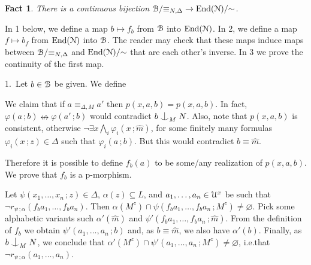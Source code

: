 \documentclass{amsproc}
\makeatletter
\def\nonfork{\mathrel{\raise0.2ex\hbox{\ooalign{\hidewidth$\vert$\hidewidth\cr\raise-0.8ex\hbox{$\smile$}}}}}
\def\U{\EuScript U}
\def\B{\EuScript B}
\def\N{\EuScript N}
\def\phi{\varphi}
\newcounter{thm}
\theoremstyle{mio}
\newtheorem{fact}[thm]{Fact}\tcolorboxenvironment{fact}{mythm}
\providecommand{\proofNameStyle}{\bfseries}
\renewenvironment{proof}[1][\proofname]{\par
  \pushQED{\qed}%
  \normalfont%
  \trivlist
  \item[\hskip\labelsep
        \proofNameStyle
    #1\@addpunct{.}]\ignorespaces
}{%
  \popQED\endtrivlist\@endpefalse
}
\makeatother
\begin{document}
\begin{fact}
  There is a continuous bijection $\B/{\equiv_{N,\Delta}}\to{\rm End}(\N)/{\sim}$.
\end{fact}

\begin{proof}
  In 1 below, we define a map $b\mapsto f_b$ from $\B$ into ${\rm End}(\N)$. In 2, we define a map $f\mapsto b_f$ from ${\rm End}(\N)$ into $\B$.
  The reader may check that these maps induce maps between $\B/{\equiv_{N,\Delta}}$ and ${\rm End}(\N)/{\sim}$ that are each other's inverse.
  In 3 we prove the continuity of the first map.

  1.\ 
  Let $b\in\B$ be given.
  We define
  
  \ceq{\hfill p(x,y,z)}{=}{\big\{\phi(y\,;z)\rightarrow\phi(x\,;\hat m)\ :\ \phi(x\,;z)\in\Delta\big\}.}

  We claim that if $a\equiv_{\Delta,M}a'$ then $p(x,a,b)=p(x,a,b)$.
  In fact, $\phi(a\,;b)\nleftrightarrow\phi(a'\,;b)$ would contradict $b\nonfork_MN$.
  Also, note that $p(x,a,b)$ is consistent, otherwise $\neg\exists x\bigwedge_i\phi_i(x\,;\hat m)$, for some finitely many formulas $\phi_i(x\,;z)\in\Delta$ such that $\phi_i(a\,;b)$.
  But this would contradict $b\equiv\hat m$.

  Therefore it is possible to define $f_b(a)$ to be some/any realization of $p(x,a,b)$.
  We prove that $f_b$ is a p-morphism.

  Let $\psi(x_1,\dots,x_n\,;z)\in\Delta$, $\alpha(z)\subseteq L$, and $a_1,\dots,a_n\in\U^x$ be such that $\neg r_{\psi\,;\alpha}(f_ba_1,\dots,f_ba_n)$.
  Then $\alpha(M^z)\cap\psi(f_ba_1,\dots,f_ba_n\,;M^z)\neq\varnothing$.
  Pick some alphabetic variants such $\alpha'(\hat m)$ and $\psi'(f_ba_1,\dots,f_ba_n\,;\hat m)$.
  From the definition of $f_b$ we obtain $\psi'(a_1,\dots,a_n\,;b)$ and, as $b\equiv\hat m$, we also have $\alpha'(b)$.
  Finally, as $b\nonfork_MN$, we conclude that $\alpha'(M^z)\cap\psi'(a_1,\dots,a_n\,;M^z)\neq\varnothing$, i.e.\@ that $\neg r_{\psi\,;\alpha}(a_1,\dots,a_n)$.
  
  
  




\end{proof}
\end{document}

